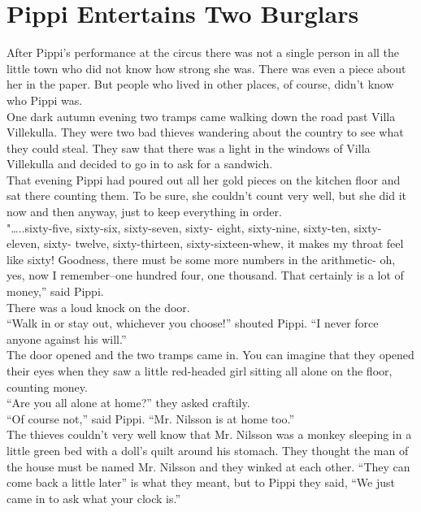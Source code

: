 \documentclass{standard}
\begin{document}
\section{Pippi Entertains Two Burglars}
After Pippi’s performance at the circus there was not a single person in all the little town who did not know how strong she was. There was even a piece about her in the paper. But people who lived in other places, of course, didn’t know who Pippi was.\\

One dark autumn evening two tramps came walking down the road past Villa Villekulla. They were two bad thieves wandering about the country to see what they could steal. They saw that there was a light in the windows of Villa Villekulla and decided to go in to ask for a sandwich.\\

That evening Pippi had poured out all her gold pieces on the kitchen floor and sat there counting them. To be sure, she couldn’t count very well, but she did it now and then anyway, just to keep everything in order.\\

"…..sixty-five, sixty-six, sixty-seven, sixty- eight, sixty-nine, sixty-ten, sixty- eleven, sixty- twelve, sixty-thirteen, sixty-sixteen-whew, it makes my throat feel like sixty! Goodness, there must be some more numbers in the arithmetic- oh, yes, now I remember--one hundred four, one thousand. That certainly is a lot of money,” said Pippi.\\

There was a loud knock on the door.\\

“Walk in or stay out, whichever you choose!” shouted Pippi. “I never force anyone against his will.”\\

The door opened and the two tramps came in. You can imagine that they opened their eyes when they saw a little red-headed girl sitting all alone on the floor, counting money.\\

“Are you all alone at home?” they asked craftily.\\

“Of course not,” said Pippi. “Mr. Nilsson is at home too.”\\

The thieves couldn’t very well know that Mr. Nilsson was a monkey sleeping in a little green bed with a doll’s quilt around his stomach. They thought the man of the house must be named Mr. Nilsson and they winked at each other. “They can come back a little later” is what they meant, but to Pippi they said, “We just came in to ask what your clock is.”\\
\end{document}
